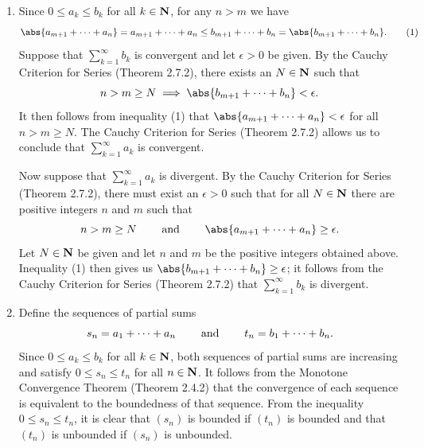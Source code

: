 \documentclass{lew98_solutions}
\begin{document}
\begin{solution}
    \begin{enumerate}
        \item Since \( 0 \leq a_k \leq b_k \) for all \( k \in \mathbf{N} \), for any \( n > m \) we have
        \[
            \abs{a_{m+1} + \cdots + a_n} = a_{m+1} + \cdots + a_n \leq b_{m+1} + \cdots + b_n = \abs{b_{m+1} + \cdots + b_n}. \tag{1}
        \]
        Suppose that \( \sum_{k=1}^{\infty} b_k \) is convergent and let \( \epsilon > 0 \) be given. By the Cauchy Criterion for Series (Theorem 2.7.2), there exists an \( N \in \mathbf{N} \) such that
        \[
            n > m \geq N \implies \abs{b_{m+1} + \cdots + b_n} < \epsilon.
        \]
        It then follows from inequality (1) that \( \abs{a_{m+1} + \cdots + a_n} < \epsilon \) for all \( n > m \geq N \). The Cauchy Criterion for Series (Theorem 2.7.2) allows us to conclude that \( \sum_{k=1}^{\infty} a_k \) is convergent.

        Now suppose that \( \sum_{k=1}^{\infty} a_k \) is divergent. By the Cauchy Criterion for Series (Theorem 2.7.2), there must exist an \( \epsilon > 0 \) such that for all \( N \in \mathbf{N} \) there are positive integers \( n \) and \( m \) such that
        \[
            n > m \geq N \hspaceand \abs{a_{m+1} + \cdots + a_n} \geq \epsilon.
        \]
        Let \( N \in \mathbf{N} \) be given and let \( n \) and \( m \) be the positive integers obtained above. Inequality (1) then gives us \( \abs{b_{m+1} + \cdots + b_n} \geq \epsilon \); it follows from the Cauchy Criterion for Series (Theorem 2.7.2) that \( \sum_{k=1}^{\infty} b_k \) is divergent.

        \item Define the sequences of partial sums
        \[
            s_n = a_1 + \cdots + a_n \hspace{8mm} \text{and} \hspace{8mm} t_n = b_1 + \cdots + b_n.
        \]
        Since \( 0 \leq a_k \leq b_k \) for all \( k \in \mathbf{N} \), both sequences of partial sums are increasing and satisfy \( 0 \leq s_n \leq t_n \) for all \( n \in \mathbf{N} \). It follows from the Monotone Convergence Theorem (Theorem 2.4.2) that the convergence of each sequence is equivalent to the boundedness of that sequence. From the inequality \( 0 \leq s_n \leq t_n \), it is clear that \( (s_n) \) is bounded if \( (t_n) \) is bounded and that \( (t_n) \) is unbounded if \( (s_n) \) is unbounded.
    \end{enumerate}
\end{solution}
\end{document}
